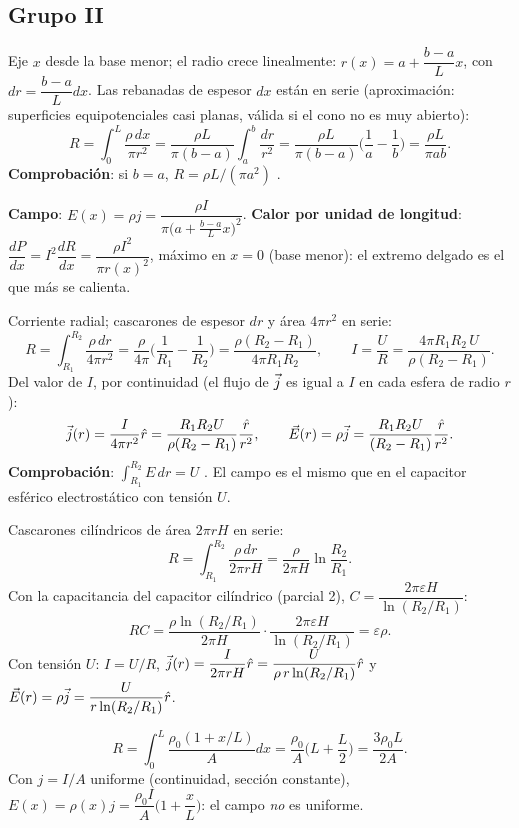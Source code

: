 \subsection*{Grupo II}
Eje $x$ desde la base menor; el radio crece linealmente: $r(x)=a+\dfrac{b-a}{L}x$, con $dr=\dfrac{b-a}{L}dx$. Las rebanadas de espesor $dx$ están en serie (aproximación: superficies equipotenciales casi planas, válida si el cono no es muy abierto):
\[
R=\int_0^L\frac{\rho\,dx}{\pi r^2}=\frac{\rho L}{\pi(b-a)}\int_a^b\frac{dr}{r^2}=\frac{\rho L}{\pi(b-a)}\Big(\frac1a-\frac1b\Big)=\boxed{\frac{\rho L}{\pi ab}}.
\]
\textbf{Comprobación}: si $b=a$, $R=\rho L/(\pi a^2)$ \checkmark.

\textbf{Campo}: $E(x)=\rho j=\dfrac{\rho I}{\pi\big(a+\frac{b-a}{L}x\big)^2}$. \textbf{Calor por unidad de longitud}: $\dfrac{dP}{dx}=I^2\dfrac{dR}{dx}=\dfrac{\rho I^2}{\pi r(x)^2}$, máximo en $x=0$ (base menor): el extremo delgado es el que más se calienta.

Corriente radial; cascarones de espesor $dr$ y área $4\pi r^2$ en serie:
\[
R=\int_{R_1}^{R_2}\frac{\rho\,dr}{4\pi r^2}=\boxed{\frac{\rho}{4\pi}\Big(\frac1{R_1}-\frac1{R_2}\Big)=\frac{\rho(R_2-R_1)}{4\pi R_1R_2}},\qquad I=\frac UR=\frac{4\pi R_1R_2\,U}{\rho(R_2-R_1)}.
\]
Del valor de $I$, por continuidad (el flujo de $\vec{j}$ es igual a $I$ en cada esfera de radio $r$):
\[
\vec{j}(r)=\frac{I}{4\pi r^2}\hat r=\frac{R_1R_2U}{\rho(R_2-R_1)}\frac{\hat r}{r^2},\qquad\vec{E}(r)=\rho\vec{j}=\frac{R_1R_2U}{(R_2-R_1)}\frac{\hat r}{r^2}.
\]
\textbf{Comprobación}: $\int_{R_1}^{R_2}E\,dr=U$ \checkmark. El campo es el mismo que en el capacitor esférico electrostático con tensión $U$.

Cascarones cilíndricos de área $2\pi rH$ en serie:
\[
R=\int_{R_1}^{R_2}\frac{\rho\,dr}{2\pi rH}=\boxed{\frac{\rho}{2\pi H}\ln\frac{R_2}{R_1}}.
\]
Con la capacitancia del capacitor cilíndrico (parcial 2), $C=\dfrac{2\pi\varepsilon H}{\ln(R_2/R_1)}$:
\[
RC=\frac{\rho\ln(R_2/R_1)}{2\pi H}\cdot\frac{2\pi\varepsilon H}{\ln(R_2/R_1)}=\boxed{\varepsilon\rho}.
\]
Con tensión $U$: $I=U/R$, $\vec{j}(r)=\dfrac{I}{2\pi rH}\hat r=\dfrac{U}{\rho\,r\ln(R_2/R_1)}\hat r$ y $\vec{E}(r)=\rho\vec{j}=\dfrac{U}{r\ln(R_2/R_1)}\hat r$.

\[
R=\int_0^L\frac{\rho_0(1+x/L)}{A}dx=\frac{\rho_0}{A}\Big(L+\frac L2\Big)=\boxed{\frac{3\rho_0L}{2A}}.
\]
Con $j=I/A$ uniforme (continuidad, sección constante), $E(x)=\rho(x)j=\dfrac{\rho_0I}{A}\Big(1+\dfrac xL\Big)$: el campo \emph{no} es uniforme.

